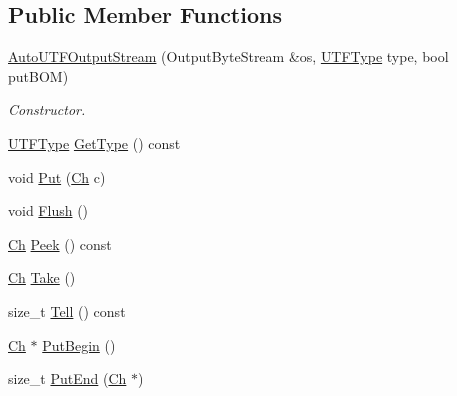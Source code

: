\subsection*{Public Member Functions}
\begin{DoxyCompactItemize}
\item 
\mbox{\hyperlink{classrapidjson_1_1_auto_u_t_f_output_stream_a39c828ee4c5b052df7338ec7fda1a17d}{Auto\+U\+T\+F\+Output\+Stream}} (Output\+Byte\+Stream \&os, \mbox{\hyperlink{namespacerapidjson_a4aacabc0f8cea1cd628f466d890773eb}{U\+T\+F\+Type}} type, bool put\+B\+OM)
\begin{DoxyCompactList}\small\item\em Constructor. \end{DoxyCompactList}\item 
\mbox{\hyperlink{namespacerapidjson_a4aacabc0f8cea1cd628f466d890773eb}{U\+T\+F\+Type}} \mbox{\hyperlink{classrapidjson_1_1_auto_u_t_f_output_stream_ae01c4c0e6ac78b9bc875a9e73c63fd05}{Get\+Type}} () const
\item 
void \mbox{\hyperlink{classrapidjson_1_1_auto_u_t_f_output_stream_a11ab92b78f15ccb20917887f06d6de66}{Put}} (\mbox{\hyperlink{classrapidjson_1_1_auto_u_t_f_output_stream_aaf40884d8f4fbf24ea040d3363c9967e}{Ch}} c)
\item 
void \mbox{\hyperlink{classrapidjson_1_1_auto_u_t_f_output_stream_a04746e5fa16007b2cbe4be5f8d68940d}{Flush}} ()
\item 
\mbox{\hyperlink{classrapidjson_1_1_auto_u_t_f_output_stream_aaf40884d8f4fbf24ea040d3363c9967e}{Ch}} \mbox{\hyperlink{classrapidjson_1_1_auto_u_t_f_output_stream_a89e2fba1e92b4f1408744934fcb56881}{Peek}} () const
\item 
\mbox{\hyperlink{classrapidjson_1_1_auto_u_t_f_output_stream_aaf40884d8f4fbf24ea040d3363c9967e}{Ch}} \mbox{\hyperlink{classrapidjson_1_1_auto_u_t_f_output_stream_a0fd284bc102b7802bf5541a3169d912e}{Take}} ()
\item 
size\+\_\+t \mbox{\hyperlink{classrapidjson_1_1_auto_u_t_f_output_stream_ac6c7dadb3851cf9e49c55273dd89937c}{Tell}} () const
\item 
\mbox{\hyperlink{classrapidjson_1_1_auto_u_t_f_output_stream_aaf40884d8f4fbf24ea040d3363c9967e}{Ch}} $\ast$ \mbox{\hyperlink{classrapidjson_1_1_auto_u_t_f_output_stream_ad3c65d2c5f94590add9bd743f09c0c63}{Put\+Begin}} ()
\item 
size\+\_\+t \mbox{\hyperlink{classrapidjson_1_1_auto_u_t_f_output_stream_a0348cb8d01546573894371d60aaaea94}{Put\+End}} (\mbox{\hyperlink{classrapidjson_1_1_auto_u_t_f_output_stream_aaf40884d8f4fbf24ea040d3363c9967e}{Ch}} $\ast$)
\end{DoxyCompactItemize}
